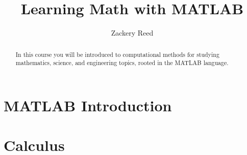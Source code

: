 \documentclass{xourse}
\title{Learning Math with MATLAB}
\author{Zackery Reed}
\begin{document}
\begin{abstract}
    In this course you will be introduced to computational methods for studying mathematics, science, and engineering topics, rooted in the MATLAB language.
\end{abstract}
\maketitle

\part{MATLAB Introduction}




\part{Calculus}
\end{document}
